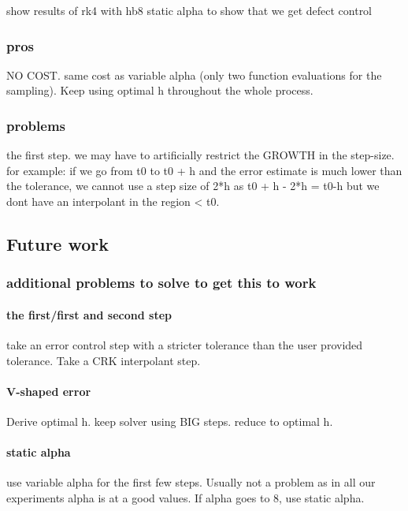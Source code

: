 \documentclass{article}
\begin{document}
show results of rk4 with hb8 static alpha to show that we get defect control
	
\subsubsection{pros}
NO COST. same cost as variable alpha (only two function evaluations for the sampling). Keep using optimal h throughout the whole process.

\subsubsection{problems}
the first step. we may have to artificially restrict the GROWTH in the step-size.
for example:
if we go from t0 to t0 + h and the error estimate is much lower than the tolerance, we cannot use a step size of 2*h as t0 + h - 2*h = t0-h but we dont have an interpolant in the region < t0.

\subsection{Future work}
\subsubsection{additional problems to solve to get this to work}
\paragraph{the first/first and second step}
take an error control step with a stricter tolerance than the user provided tolerance. 
Take a CRK interpolant step.

\paragraph{V-shaped error}
Derive optimal h. keep solver using BIG steps. reduce to optimal h.

\paragraph{static alpha}
use variable alpha for the first few steps. Usually not a problem as in all our experiments alpha is at a good values.
If alpha goes to 8, use static alpha.
\end{document}
